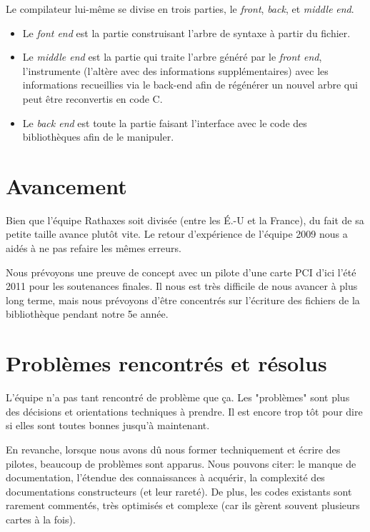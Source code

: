 \documentclass[francais]{rtxreport}
\begin{document}
Le compilateur lui-même se divise en trois parties, le \emph{front}, \emph{back}, et \emph{middle}
\emph{end}.

\begin{itemize}
	\item Le \emph{font end} est la partie construisant l’arbre de syntaxe à partir du
	fichier.

	\item Le \emph{middle end} est la partie qui traite l’arbre généré par le
	\emph{front end}, l’instrumente (l’altère avec des informations supplémentaires)
	avec les informations recueillies via le back-end afin de régénérer un nouvel
	arbre qui peut être reconvertis en code C.

	\item Le \emph{back end} est toute la partie
	faisant l’interface avec le code des bibliothèques afin de le manipuler.
\end{itemize}


\section{Avancement}

Bien que l'équipe Rathaxes soit divisée (entre les É.-U et la France), du fait
de sa petite taille avance plutôt vite. Le retour d'expérience de l'équipe 2009
nous a aidés à ne pas refaire les mêmes erreurs.

Nous prévoyons une preuve de concept avec un pilote d’une carte PCI d’ici l'été
2011 pour les soutenances finales. Il nous est très difficile de nous avancer à
plus long terme, mais nous prévoyons d’être concentrés sur l’écriture des
fichiers de la bibliothèque pendant notre 5e année.

\section{Problèmes rencontrés et résolus}
L’équipe n’a pas tant rencontré de problème que ça. Les "problèmes" sont plus
des décisions et orientations techniques à prendre. Il est encore trop tôt pour
dire si elles sont toutes bonnes jusqu’à maintenant.

En revanche, lorsque nous avons dû nous former techniquement et écrire des
pilotes, beaucoup de problèmes sont apparus. Nous pouvons citer: le manque de
documentation, l’étendue des connaissances à acquérir, la complexité des
documentations constructeurs (et leur rareté). De plus, les codes existants
sont rarement commentés, très optimisés et complexe (car ils gèrent souvent
plusieurs cartes à la fois).
\end{document}
